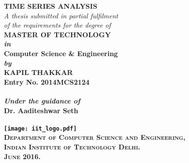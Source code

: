 \begin{titlepage}
\begin{center}

\LARGE{\textsf{\bfseries TIME SERIES ANALYSIS}}\\
\vspace{20pt}
\normalsize
\emph{A thesis submitted in partial fulfilment} \\
\emph{of the requirements for the degree of} \\
\vspace{20pt}
\bfseries MASTER OF TECHNOLOGY \\
\vspace{20pt}
\emph {in}\\
\vspace{20pt}
\bfseries Computer Science \& Engineering \\
\vspace{20pt}
\emph {by}\\
\vspace{20pt}
\Large{\textsf{\bfseries KAPIL THAKKAR}} \\
{\normalsize \textsf{\bfseries Entry No. 2014MCS2124}}\\
\ \\
{\normalsize \emph {Under the guidance of}}
\ \\
\Large{\textsf{\bfseries Dr. Aaditeshwar Seth}} \\
\ \\
\vspace{30pt}
\texttt{[image: iit\_logo.pdf]} \\
\vspace{10pt}
\large{\textsc{Department of Computer Science and Engineering,\\
Indian Institute of Technology Delhi.\\ June 2016.}}
\end{center}
\end{titlepage}
